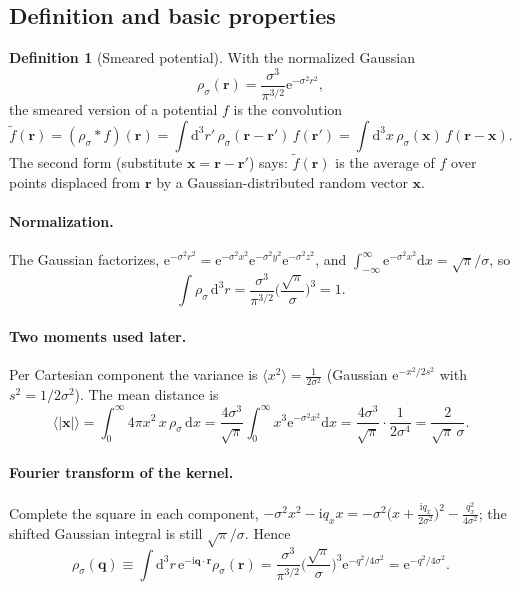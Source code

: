 \documentclass[11pt,a4paper]{article}
\numberwithin{equation}{section}
\theoremstyle{definition}
\newtheorem{definition}{Definition}[section]
\theoremstyle{plain}
\theoremstyle{remark}
\numberwithin{algorithm}{section}
\newcommand{\vr}{\bm r}
\newcommand{\vq}{\bm q}
\newcommand{\dd}{\mathrm{d}}
\newcommand{\ii}{\mathrm{i}}
\newcommand{\ee}{\mathrm{e}}
\begin{document}
\subsection{Definition and basic properties}
\begin{definition}[Smeared potential]
With the normalized Gaussian
\begin{equation}
\rho_\sigma(\vr)=\frac{\sigma^3}{\pi^{3/2}}\ee^{-\sigma^2r^2},
\end{equation}
the smeared version of a potential $f$ is the convolution
\begin{equation}
\tilde f(\vr)=(\rho_\sigma*f)(\vr)=\int\dd^3r'\,\rho_\sigma(\vr-\vr')\,f(\vr')=\int\dd^3x\,\rho_\sigma(\bm x)\,f(\vr-\bm x).
\label{eq:smdef}
\end{equation}
The second form (substitute $\bm x=\vr-\vr'$) says: $\tilde f(\vr)$ is the average of $f$ over points displaced from $\vr$ by a Gaussian-distributed random vector $\bm x$.
\end{definition}

\paragraph{Normalization.} The Gaussian factorizes, $\ee^{-\sigma^2r^2}=\ee^{-\sigma^2x^2}\ee^{-\sigma^2y^2}\ee^{-\sigma^2z^2}$, and $\int_{-\infty}^\infty\ee^{-\sigma^2x^2}\dd x=\sqrt\pi/\sigma$, so
\begin{equation}
\int\rho_\sigma\,\dd^3r=\frac{\sigma^3}{\pi^{3/2}}\Big(\frac{\sqrt\pi}{\sigma}\Big)^3=1 .
\end{equation}
\paragraph{Two moments used later.} Per Cartesian component the variance is $\langle x^2\rangle=\frac{1}{2\sigma^2}$ (Gaussian $\ee^{-x^2/2s^2}$ with $s^2=1/2\sigma^2$). The mean distance is
\begin{equation}
\langle|\bm x|\rangle=\int_0^\infty4\pi x^2\,x\,\rho_\sigma\,\dd x=\frac{4\sigma^3}{\sqrt\pi}\int_0^\infty x^3\ee^{-\sigma^2x^2}\dd x=\frac{4\sigma^3}{\sqrt\pi}\cdot\frac{1}{2\sigma^4}=\frac{2}{\sqrt\pi\,\sigma}.
\end{equation}

\paragraph{Fourier transform of the kernel.} Complete the square in each component, $-\sigma^2x^2-\ii q_xx=-\sigma^2\big(x+\frac{\ii q_x}{2\sigma^2}\big)^2-\frac{q_x^2}{4\sigma^2}$; the shifted Gaussian integral is still $\sqrt\pi/\sigma$. Hence
\begin{equation}
\rho_\sigma(\vq)\equiv\int\dd^3r\,\ee^{-\ii\vq\cdot\vr}\rho_\sigma(\vr)=\frac{\sigma^3}{\pi^{3/2}}\Big(\frac{\sqrt\pi}{\sigma}\Big)^3\ee^{-q^2/4\sigma^2}=\ee^{-q^2/4\sigma^2}.
\end{equation}
\end{document}
